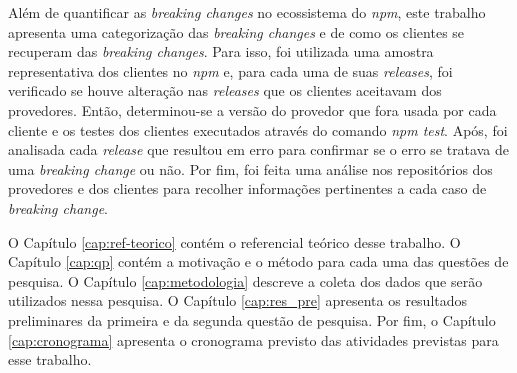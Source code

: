 Além de quantificar as \textit{breaking changes} no ecossistema do \textit{npm}, este trabalho apresenta uma categorização das \textit{breaking changes} e de como os clientes se recuperam das \textit{breaking changes}. Para isso, foi utilizada uma amostra representativa dos clientes no \textit{npm} e, para cada uma de suas \textit{releases}, foi verificado se houve alteração nas \textit{releases} que os clientes aceitavam dos provedores. Então, determinou-se a versão do provedor que fora usada por cada cliente e os testes dos clientes executados através do comando \textit{npm test}. Após, foi analisada cada \textit{release} que resultou em erro para confirmar se o erro se tratava de uma \textit{breaking change} ou não. Por fim, foi feita uma análise nos repositórios dos provedores e dos clientes para recolher informações pertinentes a cada caso de \textit{breaking change}.

O Capítulo \ref{cap:ref-teorico} contém o referencial teórico desse trabalho. O Capítulo \ref{cap:qp} contém a motivação e o método para cada uma das questões de pesquisa. O Capítulo \ref{cap:metodologia} descreve a coleta dos dados que serão utilizados nessa pesquisa. O Capítulo \ref{cap:res_pre} apresenta os resultados preliminares da primeira e da segunda questão de pesquisa. Por fim, o Capítulo \ref{cap:cronograma} apresenta o cronograma previsto das atividades previstas para esse trabalho.


